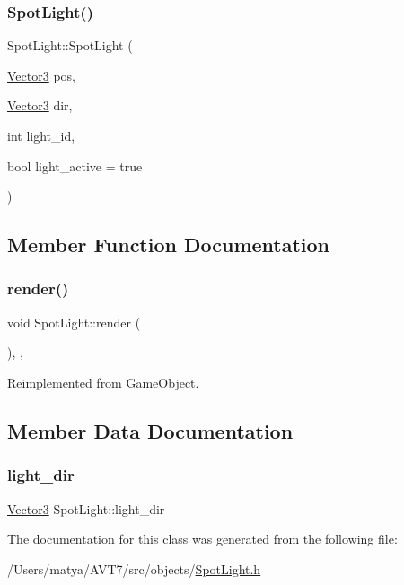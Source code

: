 \subsubsection{\texorpdfstring{Spot\+Light()}{SpotLight()}}
{\footnotesize\ttfamily Spot\+Light\+::\+Spot\+Light (\begin{DoxyParamCaption}\item[{\hyperlink{class_vector3}{Vector3}}]{pos,  }\item[{\hyperlink{class_vector3}{Vector3}}]{dir,  }\item[{int}]{light\+\_\+id,  }\item[{bool}]{light\+\_\+active = {\ttfamily true} }\end{DoxyParamCaption})\hspace{0.3cm}{\ttfamily [inline]}}



\subsection{Member Function Documentation}
\mbox{\label{class_spot_light_a05dc942328210344caff20ffd58d0eb6}} 
\subsubsection{\texorpdfstring{render()}{render()}}
{\footnotesize\ttfamily void Spot\+Light\+::render (\begin{DoxyParamCaption}{ }\end{DoxyParamCaption})\hspace{0.3cm}{\ttfamily [inline]}, {\ttfamily [final]}, {\ttfamily [virtual]}}



Reimplemented from \hyperlink{class_game_object_a484efb66a7a27c101e84c11d9905d7a6}{Game\+Object}.



\subsection{Member Data Documentation}
\mbox{\label{class_spot_light_a105b6a5c34c8ee65a822a84090c26ba1}} 
\subsubsection{\texorpdfstring{light\+\_\+dir}{light\_dir}}
{\footnotesize\ttfamily \hyperlink{class_vector3}{Vector3} Spot\+Light\+::light\+\_\+dir}



The documentation for this class was generated from the following file\+:\begin{DoxyCompactItemize}
\item 
/\+Users/matya/\+A\+V\+T7/src/objects/\hyperlink{_spot_light_8h}{Spot\+Light.\+h}\end{DoxyCompactItemize}
